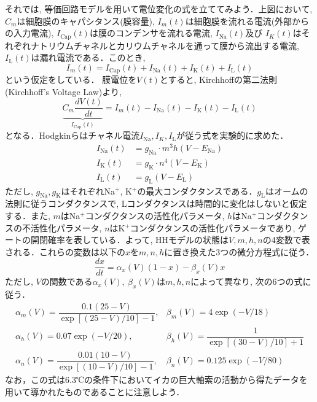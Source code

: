 それでは, 等価回路モデルを用いて電位変化の式を立ててみよう．上図において, $C_m$は細胞膜のキャパシタンス(膜容量), $I_{m}(t)$は細胞膜を流れる電流(外部からの入力電流), $I_\text{Cap}(t)$は膜のコンデンサを流れる電流, $I_\text{Na}(t)$及び $I_K(t)$はそれぞれナトリウムチャネルとカリウムチャネルを通って膜から流出する電流, $I_\text{L}(t)$は漏れ電流である．このとき, 
$$
I_{m}(t)=I_\text{Cap}(t)+I_\text{Na}(t)+I_\text{K}(t)+I_\text{L}(t)    
$$
という仮定をしている．
膜電位を$V(t)$とすると, Kirchhoffの第二法則 (Kirchhoff's Voltage Law)より, 
$$
\underbrace{C_m\frac {dV(t)}{dt}}_{I_\text{Cap} (t)}=I_{m}(t)-I_\text{Na}(t)-I_\text{K}(t)-I_\text{L}(t)
$$
となる．Hodgkinらはチャネル電流$I_\text{Na}, I_K, I_\text{L}$が従う式を実験的に求めた．
$$
\begin{aligned}
I_\text{Na}(t) &= g_{\text{Na}}\cdot m^{3}h(V-E_{\text{Na}})\\
I_\text{K}(t) &= g_{\text{K}}\cdot n^{4}(V-E_{\text{K}})\\
I_\text{L}(t) &= g_{\text{L}}(V-E_{\text{L}})
\end{aligned}
$$
ただし, $g_{\text{Na}}, g_{\text{K}}$はそれぞれNa$^+$, K$^+$の最大コンダクタンスである．$g_{\text{L}}$はオームの法則に従うコンダクタンスで, Lコンダクタンスは時間的に変化はしないと仮定する．また, $m$はNa$^+$コンダクタンスの活性化パラメータ, $h$はNa$^+$コンダクタンスの不活性化パラメータ, $n$はK$^+$コンダクタンスの活性化パラメータであり, ゲートの開閉確率を表している．よって, HHモデルの状態は$V, m, h, n$の4変数で表される．これらの変数は以下の$x$を$m, n, h$に置き換えた3つの微分方程式に従う． 
$$
\frac{dx}{dt}=\alpha_{x}(V)(1-x)-\beta_{x}(V)x
$$
ただし, $V$の関数である$\alpha_{x}(V),\ \beta_{x}(V)$は$m, h, n$によって異なり, 次の6つの式に従う．
$$
\begin{array}{ll}
\alpha_{m}(V)=\dfrac {0.1(25-V)}{\exp \left[(25-V)/10\right]-1}, &\beta_{m}(V)=4\exp {(-V/18)}\\
\alpha_{h}(V)=0.07\exp {(-V/20)}, & \beta_{h}(V)={\dfrac{1}{\exp {\left[(30-V)/10 \right]}+1}}\\
\alpha_{n}(V)={\dfrac {0.01(10-V)}{\exp {\left[(10-V)/10\right]}-1}},& \beta_{n}(V)=0.125\exp {(-V/80)} 
\end{array}
$$
なお，この式は6.3℃の条件下においてイカの巨大軸索の活動から得たデータを用いて導かれたものであることに注意しよう．